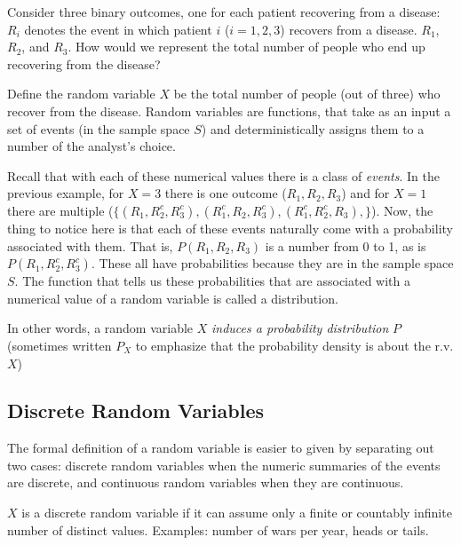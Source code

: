 \documentclass[
]{book}
\begin{document}
\begin{example}
\protect\hypertarget{exm:unnamed-chunk-73}{}\label{exm:unnamed-chunk-73}Consider three binary outcomes, one for each patient recovering from a disease: \(R_i\) denotes the event in which patient \(i\) (\(i = 1, 2, 3\)) recovers from a disease. \(R_1\), \(R_2\), and \(R_3\). How would we represent the total number of people who end up recovering from the disease?
\end{example}

\begin{solution}
Define the random variable \(X\) be the total number of people (out of three) who recover from the disease. Random variables are functions, that take as an input a set of events (in the sample space \(S\)) and deterministically assigns them to a number of the analyst's choice.
\end{solution}

Recall that with each of these numerical values there is a class of \emph{events}. In the previous example, for \(X = 3\) there is one outcome (\(R_1, R_2, R_3\)) and for \(X = 1\) there are multiple (\(\{(R_1, R_2^c, R_3^c), (R_1^c, R_2, R_3^c), (R_1^c, R_2^c, R_3), \}\)). Now, the thing to notice here is that each of these events naturally come with a probability associated with them. That is, \(P(R_1, R_2, R_3)\) is a number from 0 to 1, as is \(P(R_1, R_2^c, R_3^c)\). These all have probabilities because they are in the sample space \(S\). The function that tells us these probabilities that are associated with a numerical value of a random variable is called a distribution.

In other words, a random variable \(X\) \emph{induces a probability distribution} \(P\) (sometimes written \(P_X\) to emphasize that the probability density is about the r.v. \(X\))

\hypertarget{discrete-random-variables}{%
\subsection*{Discrete Random Variables}\label{discrete-random-variables}}

The formal definition of a random variable is easier to given by separating out two cases: discrete random variables when the numeric summaries of the events are discrete, and continuous random variables when they are continuous.

\begin{definition}
\protect\hypertarget{def:unnamed-chunk-75}{}\label{def:unnamed-chunk-75}\(X\) is a discrete random variable if it can assume only a finite or countably infinite number of distinct values. Examples: number of wars per year, heads or tails.
\end{definition}
\end{document}
